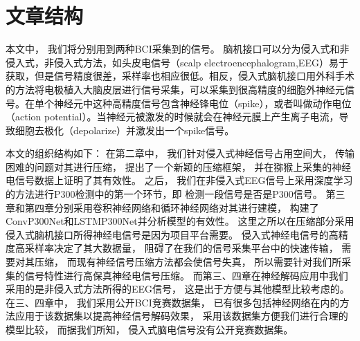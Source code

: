 \section{文章结构}
本文中， 我们将分别用到两种BCI采集到的信号。 脑机接口可以分为侵入式和非侵入式，非侵入式方法，如头皮电信号（scalp electroencephalogram,EEG）易于获取，但是信号精度很差，采样率也相应很低。相反，侵入式脑机接口用外科手术的方法将电极植入大脑皮层进行信号采集，可以采集到很高精度的细胞外神经元信号。在单个神经元中这种高精度信号包含神经锋电位（spike），或者叫做动作电位（action potential）。当神经元被激发的时候就会在神经元膜上产生离子电流，导致细胞去极化（depolarize）并激发出一个spike信号。

本文的组织结构如下： 在第二章中， 我们针对侵入式神经信号占用空间大， 传输困难的问题对其进行压缩， 提出了一个新颖的压缩框架， 并在猕猴上采集的神经电信号数据上证明了其有效性。 之后， 我们在非侵入式EEG信号上采用深度学习的方法进行P300检测中的第一个环节，即 检测一段信号是否是P300信号。 第三章和第四章分别采用卷积神经网络和循环神经网络对其进行建模， 构建了ConvP300Net和LSTMP300Net并分析模型的有效性。 这里之所以在压缩部分采用侵入式脑机接口所得神经电信号是因为项目平台需要。 侵入式神经电信号的高精度高采样率决定了其大数据量， 阻碍了在我们的信号采集平台中的快速传输， 需要对其压缩， 而现有神经信号压缩方法都会使信号失真， 所以需要针对我们所采集的信号特性进行高保真神经电信号压缩。 而第三、四章在神经解码应用中我们采用的是非侵入式方法所得的EEG信号， 这是出于方便与其他模型比较考虑的。 在三、四章中， 我们采用公开BCI竞赛数据集\cite{blankertz2006bci}， 已有很多包括神经网络在内的方法应用于该数据集以提高神经信号解码效果， 采用该数据集方便我们进行合理的模型比较， 而据我们所知， 侵入式脑电信号没有公开竞赛数据集。










